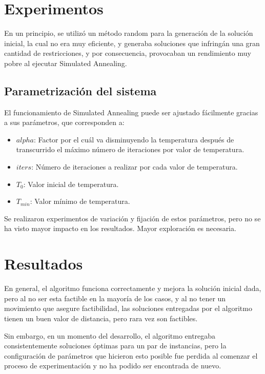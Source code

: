 \documentclass[letter, 10pt]{article}
\begin{document}
\section{Experimentos}

En un principio, se utiliz\'o un m\'etodo random para la generaci\'on de la soluci\'on inicial, la cual no era muy eficiente, y generaba soluciones que infring\'an una gran cantidad de restricciones, y por consecuencia, provocaban un rendimiento muy pobre al ejecutar Simulated Annealing.

\subsection{Parametrizaci\'on del sistema}
El funcionamiento de Simulated Annealing puede ser ajustado f\'acilmente gracias a sus par\'ametros, que corresponden a:

\begin{itemize}
  \item $alpha$: Factor por el cu\'al va disminuyendo la temperatura despu\'es de transcurrido el m\'aximo n\'umero de iteraciones por valor de temperatura.
  \item $iters$: N\'umero de iteraciones a realizar por cada valor de temperatura.
  \item $T_0$: Valor inicial de temperatura.
  \item $T_{min}$: Valor m\'inimo de temperatura.
\end{itemize}

Se realizaron experimentos de variaci\'on y fijaci\'on de estos par\'ametros, pero no se ha visto mayor impacto en los resultados. Mayor exploraci\'on es necesaria.


\section{Resultados}

En general, el algoritmo funciona correctamente y mejora la soluci\'on inicial dada, pero al no ser esta factible en la mayor\'ia de los casos, y al no tener un movimiento que asegure factibilidad, las soluciones entregadas por el algoritmo tienen un buen valor de distancia, pero rara vez son factibles.

Sin embargo, en un momento del desarrollo, el algoritmo entregaba consistentemente soluciones \'optimas para un par de instancias, pero la configuraci\'on de par\'ametros que hicieron esto posible fue perdida al comenzar el proceso de experimentaci\'on y no ha podido ser encontrada de nuevo.
\end{document}
